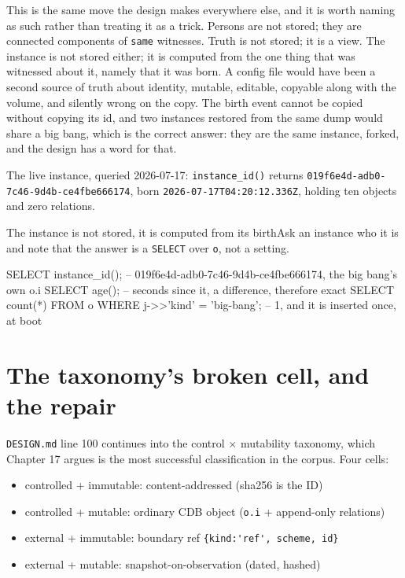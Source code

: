 This is the same move the design makes everywhere else, and it is worth naming as such rather than treating it as a trick. Persons are not stored; they are connected components of \texttt{same} witnesses. Truth is not stored; it is a view. The instance is not stored either; it is computed from the one thing that was witnessed about it, namely that it was born. A config file would have been a second source of truth about identity, mutable, editable, copyable along with the volume, and silently wrong on the copy. The birth event cannot be copied without copying its id, and two instances restored from the same dump would share a big bang, which is the correct answer: they are the same instance, forked, and the design has a word for that.

The live instance, queried 2026-07-17: \texttt{instance\_id()} returns \texttt{019f6e4d-adb0-7c46-9d4b-ce4fbe666174}, born \texttt{2026-07-17T04:20:12.336Z}, holding ten objects and zero relations.

\begin{Correspondence}{The instance is not stored, it is computed from its birth}{Ask an instance who it is and note that the answer is a \texttt{SELECT} over \texttt{o}, not a setting.}
\begin{Check}
SELECT instance_id();   -- 019f6e4d-adb0-7c46-9d4b-ce4fbe666174, the big bang's own o.i
SELECT age();           -- seconds since it, a difference, therefore exact
SELECT count(*) FROM o WHERE j->>'kind' = 'big-bang';   -- 1, and it is inserted once, at boot
\end{Check}
\end{Correspondence}

\section{The taxonomy's broken cell, and the repair}

\texttt{DESIGN.md} line 100 continues into the control $\times$ mutability taxonomy, which Chapter 17 argues is the most successful classification in the corpus. Four cells:

\begin{itemize}
\item controlled + immutable: content-addressed (sha256 is the ID)
\item controlled + mutable: ordinary CDB object (\texttt{o.i} + append-only relations)
\item external + immutable: boundary ref \verb|{kind:'ref', scheme, id}|
\item external + mutable: snapshot-on-observation (dated, hashed)
\end{itemize}


